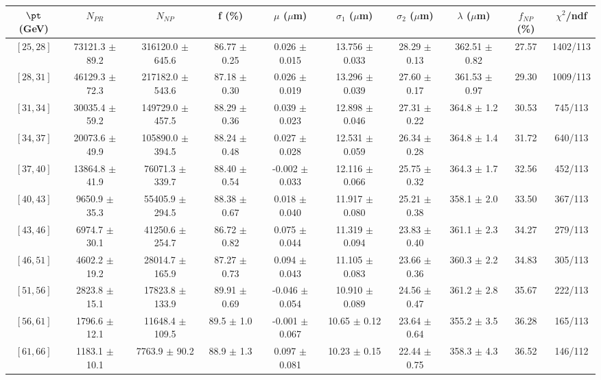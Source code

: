 \begin{tabular}{c||c|c|c|c|c|c|c||c|c}
$\pt$ (GeV) & $N_{PR}$ & $N_{NP}$ & f (\%) & $\mu$ ($\mu$m) & $\sigma_1$ ($\mu$m) & $\sigma_2$ ($\mu$m)  & $\lambda$ ($\mu$m) & $f_{NP}$ (\%) & $\chi^2$/ndf \\
\hline
$[25, 28]$ & 73121.3 $\pm$ 89.2 & 316120.0 $\pm$ 645.6 & 86.77 $\pm$ 0.25 & 0.026 $\pm$ 0.015 & 13.756 $\pm$ 0.033 & 28.29 $\pm$ 0.13 & 362.51 $\pm$ 0.82 & 27.57 & 1402/113\\
$[28, 31]$ & 46129.3 $\pm$ 72.3 & 217182.0 $\pm$ 543.6 & 87.18 $\pm$ 0.30 & 0.026 $\pm$ 0.019 & 13.296 $\pm$ 0.039 & 27.60 $\pm$ 0.17 & 361.53 $\pm$ 0.97 & 29.30 & 1009/113\\
$[31, 34]$ & 30035.4 $\pm$ 59.2 & 149729.0 $\pm$ 457.5 & 88.29 $\pm$ 0.36 & 0.039 $\pm$ 0.023 & 12.898 $\pm$ 0.046 & 27.31 $\pm$ 0.22 & 364.8 $\pm$ 1.2 & 30.53 & 745/113\\
$[34, 37]$ & 20073.6 $\pm$ 49.9 & 105890.0 $\pm$ 394.5 & 88.24 $\pm$ 0.48 & 0.027 $\pm$ 0.028 & 12.531 $\pm$ 0.059 & 26.34 $\pm$ 0.28 & 364.8 $\pm$ 1.4 & 31.72 & 640/113\\
$[37, 40]$ & 13864.8 $\pm$ 41.9 & 76071.3 $\pm$ 339.7 & 88.40 $\pm$ 0.54 & -0.002 $\pm$ 0.033 & 12.116 $\pm$ 0.066 & 25.75 $\pm$ 0.32 & 364.3 $\pm$ 1.7 & 32.56 & 452/113\\
$[40, 43]$ & 9650.9 $\pm$ 35.3 & 55405.9 $\pm$ 294.5 & 88.38 $\pm$ 0.67 & 0.018 $\pm$ 0.040 & 11.917 $\pm$ 0.080 & 25.21 $\pm$ 0.38 & 358.1 $\pm$ 2.0 & 33.50 & 367/113\\
$[43, 46]$ & 6974.7 $\pm$ 30.1 & 41250.6 $\pm$ 254.7 & 86.72 $\pm$ 0.82 & 0.075 $\pm$ 0.044 & 11.319 $\pm$ 0.094 & 23.83 $\pm$ 0.40 & 361.1 $\pm$ 2.3 & 34.27 & 279/113\\
$[46, 51]$ & 4602.2 $\pm$ 19.2 & 28014.7 $\pm$ 165.9 & 87.27 $\pm$ 0.73 & 0.094 $\pm$ 0.043 & 11.105 $\pm$ 0.083 & 23.66 $\pm$ 0.36 & 360.3 $\pm$ 2.2 & 34.83 & 305/113\\
$[51, 56]$ & 2823.8 $\pm$ 15.1 & 17823.8 $\pm$ 133.9 & 89.91 $\pm$ 0.69 & -0.046 $\pm$ 0.054 & 10.910 $\pm$ 0.089 & 24.56 $\pm$ 0.47 & 361.2 $\pm$ 2.8 & 35.67 & 222/113\\
$[56, 61]$ & 1796.6 $\pm$ 12.1 & 11648.4 $\pm$ 109.5 & 89.5 $\pm$ 1.0 & -0.001 $\pm$ 0.067 & 10.65 $\pm$ 0.12 & 23.64 $\pm$ 0.64 & 355.2 $\pm$ 3.5 & 36.28 & 165/113\\
$[61, 66]$ & 1183.1 $\pm$ 10.1 & 7763.9 $\pm$ 90.2 & 88.9 $\pm$ 1.3 & 0.097 $\pm$ 0.081 & 10.23 $\pm$ 0.15 & 22.44 $\pm$ 0.75 & 358.3 $\pm$ 4.3 & 36.52 & 146/112\\

\end{tabular}
